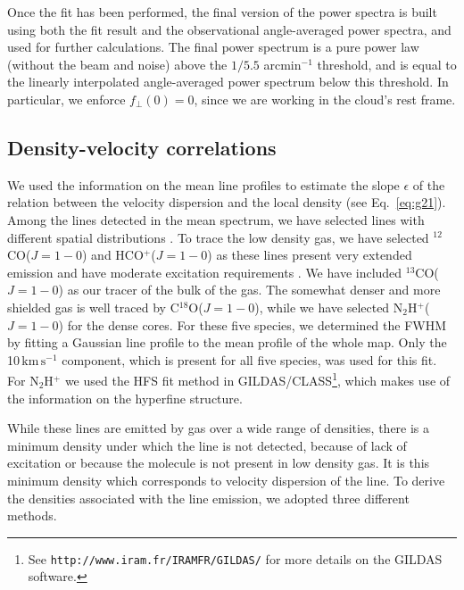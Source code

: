 \documentclass[structabstract]{aa}
\newcommand{\emm}[1]{\ensuremath{#1}}
\newcommand{\emr}[1]{\emm{\mathrm{#1}}}
\newcommand{\unit}[1]{\emr{\,#1}}
\newcommand{\kms}{\unit{km\,s^{-1}}}
\begin{document}
Once the fit has been performed, the final version of the power spectra is built using both the fit result and the observational angle-averaged power spectra, and used for further calculations. The final power spectrum is a pure power law (without the beam and noise) above the $1/5.5$ arcmin$^{-1}$ threshold, and is equal to the linearly interpolated angle-averaged power spectrum below this threshold. In particular, we enforce $f_\perp(0) = 0$, since we are working in the cloud's rest frame. 


\subsection{Density-velocity correlations}
\label{sec:g21}

We used the information on the mean line profiles to estimate the slope $\epsilon$ of the relation between the velocity dispersion and the local density  (see Eq.~\ref{eq:g21}). Among the lines detected in the mean spectrum, we have selected lines with different spatial distributions \citep{pety16}. To trace the low density gas, we have selected $^{12}$CO($J=1-0$) and HCO$^+$($J=1-0$) as these lines present very extended emission and have moderate excitation requirements \citep{pety16,liszt16}. We have included  $^{13}$CO($J=1-0$) as our tracer of the bulk of the gas. The somewhat denser and more shielded gas is well traced by C$^{18}$O($J=1-0$), while we have selected N$_2$H$^+$($J=1-0$) for the dense cores. For these five species, we determined the FWHM by fitting a Gaussian line profile to the mean profile of the whole map. Only the 10\kms{} component, which is present for all five species, was used for this fit. For N$_2$H$^+$ we used the HFS fit method in GILDAS/CLASS\footnote{See \texttt{http://www.iram.fr/IRAMFR/GILDAS/} for more details on the GILDAS software.}, which makes use of the information on the hyperfine structure.

While these lines are emitted by gas over a wide range of densities, there is a minimum density under which the line is not detected, because of lack of excitation or because the molecule is not present in low density gas. It is this minimum density which corresponds to velocity dispersion of the line. To derive the densities associated with the line emission,  we adopted three different methods.
\end{document}
